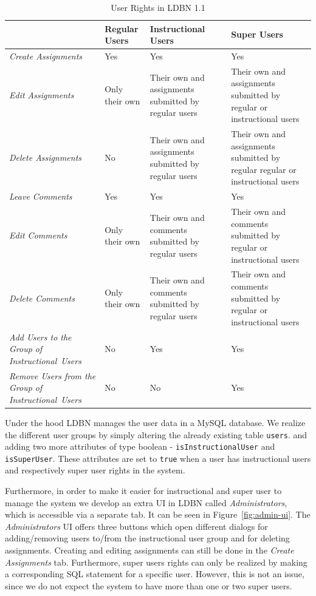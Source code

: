 \begin{center}
\begin{table}
\begin{tabular}[h]{| m{2.8cm} || m{2.2cm} | m{3.2cm} | m{3.3cm} |}
\hline
 & \textbf{Regular Users} & \textbf{Instructional Users} & \textbf{Super Users} \\
\hline
\hline
\emph{Create \mbox{Assignments}} & Yes & Yes & Yes \\
\hline
\emph{Edit \mbox{Assignments}}  & Only their own & Their own and assignments submitted by regular users & Their own and assignments submitted by regular or instructional users \\
\hline
\emph{Delete \mbox{Assignments}} & No & Their own and assignments submitted by regular users & Their own and assignments submitted by regular regular or instructional users \\
\hline
\emph{Leave \mbox{Comments}}    & Yes & Yes & Yes \\
\hline
\emph{Edit \mbox{Comments}}     & Only their own & Their own and comments submitted by regular users & Their own and comments submitted by regular or instructional users\\
\hline
\emph{Delete \mbox{Comments}}   & Only their own & Their own and comments submitted by regular users & Their own and comments submitted by regular or instructional users \\
\hline
\emph{Add Users to the Group of \mbox{Instructional Users}} & No & Yes & Yes \\
\hline
\emph{Remove Users from the Group of \mbox{Instructional Users}} & No & No & Yes \\
\hline
\end{tabular}
\caption{User Rights in LDBN 1.1}
\label{tab:user-rights}
\end{table}
\end{center}


Under the hood LDBN manages the user data in a MySQL database. 
We realize the different user groups by simply altering the already existing table \verb=users=. 
and adding two more attributes 
of type boolean - \verb=isInstructionalUser= and \verb=isSuperUser=. 
These attributes are set to \verb=true= when a user has instructional users and respectively super
user rights in the system. 

Furthermore, in order to make it easier for instructional and super user to manage the system
we develop an extra UI in LDBN called \emph{Administrators}, which is accessible via a
separate tab. It can be seen in Figure~\ref{fig:admin-ui}. 
The \emph{Administrators} UI offers three buttons which open 
different dialogs for adding/removing users to/from the instructional user group and for
deleting assignments. Creating and editing assignments can still be done in the 
\emph{Create Assignments} tab. Furthermore, super users rights can only be realized by making
a corresponding SQL statement for a specific user. However, this is not an issue, since 
we do not expect the system to have more than one or two super users. 

